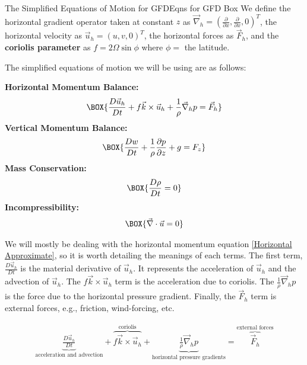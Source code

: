 \begin{fact}{The Simplified Equations of Motion for GFD}{Eqns for GFD Box}\label{Eqns for GFD Box}
    We define the horizontal gradient operator taken at constant $z$ as $\vec{\nabla}_h=\left( \frac{\partial}{\partial x},\frac{\partial}{\partial x},0 \right)^T$, the horizontal velocity as $\vec{u}_h=\left( u,v,0 \right)^T$, the horizontal forces as $\vec{F}_h$, and the \textbf{coriolis parameter} as $f=2\Omega\sin\phi$ where $\phi=$ the latitude.

    The simplified equations of motion we will be using are as follows: 
    \begin{multicols}{2}
        \textbf{Horizontal Momentum Balance:}
        \begin{gather}
            \label{Horizontal Approximate}
            \BOX{\frac{D\vec{u}_h}{Dt}+f\vec{k}\times\vec{u}_h+\frac{1}{\rho}\vec{\nabla}_hp=\vec{F}_h}
        \end{gather}
        \textbf{Vertical Momentum Balance:}
        \begin{gather}
            \label{Vertical Approximate}
            \BOX{\frac{Dw}{Dt}+\frac{1}{\rho}\frac{\partial p }{\partial z}+g=F_z}
        \end{gather}
        \textbf{Mass Conservation:}
        \begin{gather}
            \label{Mass Material Conservation}
            \BOX{\frac{D\rho}{Dt}=0}
        \end{gather}
        \textbf{Incompressibility:}
        \begin{gather}
            \label{Incompressibility}
        \BOX{\vec{\nabla}\cdot\vec{u}=0}
        \end{gather}
    \end{multicols}
\end{fact}

We will mostly be dealing with the horizontal momentum equation \ref{Horizontal Approximate}, so it is worth detailing the meanings of each terms. The first term, $\frac{D\vec{u}_h}{Dt}$ is the material derivative of $\vec{u}_h$. It represents the acceleration of $\vec{u}_h$ and the advection of $\vec{u}_h$. The $f\vec{k}\times\vec{u}_h$ term is the acceleration due to coriolis. The $\frac{1}{\rho}\vec{\nabla}_h p$ is the force due to the horizontal pressure gradient. Finally, the $\vec{F}_h$ term is external forces, e.g., friction, wind-forcing, etc.

\begin{align*}
    \underbrace{\frac{D\vec{u}_h}{Dt}}_\text{acceleration and advection}+
    \overbrace{f\vec{k}\times\vec{u}_h}^\text{coriolis}+
    \underbrace{\frac{1}{\rho}\vec{\nabla}_hp}_\text{horizontal pressure gradients}=\overbrace{\vec{F}_h}^\text{external forces}
\end{align*}

